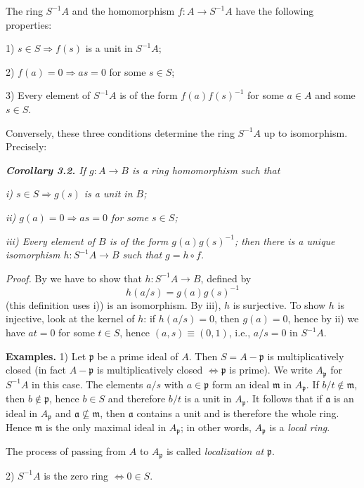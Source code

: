 The ring $S^{-1}A$ and the homomorphism $f:A\longrightarrow S^{-1}A$ have the following
properties:

1) $s\in S\Rightarrow f(s)$ is a unit in $S^{-1}A$;

2) $f(a)=0\Rightarrow as=0$ for some $s\in S$;

3) Every element of $S^{-1}A$ is of the form $f(a)f(s)^{-1}$ for some $a\in A$ and some
$s\in S$.

Conversely, these three conditions determine the ring $S^{-1}A$ up to isomorphism.  Precisely:

\medskip
\noindent\textit{\textbf{Corollary 3.2.} If $g:A\longrightarrow B$ is a ring homomorphism such that}

\noindent\textit{i) $s\in S\Rightarrow g(s)$ is a unit in $B$;}

\noindent\textit{ii) $g(a)=0\Rightarrow as=0$ for some $s\in S$;}

\noindent\textit{iii) Every element of $B$ is of the form $g(a)g(s)^{-1}$; then there is a unique
isomorphism $h:S^{-1}A\longrightarrow B$ such that $g=h\circ f$.}

\noindent\emph{Proof.}  By  we have to show that $h:S^{-1}A\longrightarrow B$, defined by
\[
h(a/s)=g(a)g(s)^{-1}
\]
(this definition uses i)) is an isomorphism.  By iii), $h$ is surjective.  To show $h$ is
injective, look at the kernel of $h$: if $h(a/s)=0$, then $g(a)=0$, hence by ii) we
have $at=0$ for some $t\in S$, hence $(a,s)\equiv(0,1)$, i.e., $a/s=0$ in $S^{-1}A$.\proofbox

\medskip
\noindent\textbf{Examples.}  1) Let $\mathfrak p$ be a prime ideal of $A$.  Then $S=A-\mathfrak p$ is multiplicatively
closed (in fact $A-\mathfrak p$ is multiplicatively closed $\Longleftrightarrow\mathfrak p$ is prime).  We write $A_\mathfrak p$ for
$S^{-1}A$ in this case.  The elements $a/s$ with $a\in\mathfrak p$ form an ideal $\mathfrak m$ in $A_\mathfrak p$.  If $b/t\notin\mathfrak m$,
then $b\notin\mathfrak p$, hence $b\in S$ and therefore $b/t$ is a unit in $A_\mathfrak p$.  It follows that if $\mathfrak a$ is an
ideal in $A_\mathfrak p$ and $\mathfrak a\nsubseteq\mathfrak m$, then $\mathfrak a$ contains a unit and is therefore the whole ring.
Hence $\mathfrak m$ is the only maximal ideal in $A_\mathfrak p$; in other words, $A_\mathfrak p$ is a \emph{local ring}.

The process of passing from $A$ to $A_\mathfrak p$ is called \emph{localization at $\mathfrak p$}.

2) $S^{-1}A$ is the zero ring $\Longleftrightarrow0\in S$.

